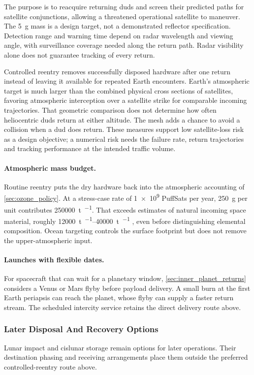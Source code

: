 \documentclass{article}
\begin{document}
The purpose is to reacquire returning duds and screen their predicted paths for satellite conjunctions, allowing a threatened operational satellite to maneuver. The \SI{5}{\gram} mass is a design target, not a demonstrated reflector specification. Detection range and warning time depend on radar wavelength and viewing angle, with surveillance coverage needed along the return path. Radar visibility alone does not guarantee tracking of every return.

Controlled reentry removes successfully disposed hardware after one return instead of leaving it available for repeated Earth encounters. Earth's atmospheric target is much larger than the combined physical cross sections of satellites, favoring atmospheric interception over a satellite strike for comparable incoming trajectories. That geometric comparison does not determine how often heliocentric duds return at either altitude. The mesh adds a chance to avoid a collision when a dud does return. These measures support low satellite-loss risk as a design objective; a numerical risk needs the failure rate, return trajectories and tracking performance at the intended traffic volume.

\paragraph{Atmospheric mass budget.}
Routine reentry puts the dry hardware back into the atmospheric accounting of \autoref{sec:ozone_policy}. At a stress-case rate of \num{1e9} PuffSats per year, \SI{250}{\gram} per unit contributes \SI{250000}{\tonne\per\year}. That exceeds estimates of natural incoming space material, roughly \SIrange{12000}{40000}{\tonne\per\year} \cite{schulz2020injection}, even before distinguishing elemental composition. Ocean targeting controls the surface footprint but does not remove the upper-atmospheric input.

\paragraph{Launches with flexible dates.}
For spacecraft that can wait for a planetary window, \autoref{sec:inner_planet_returns} considers a Venus or Mars flyby before payload delivery. A small burn at the first Earth periapsis can reach the planet, whose flyby can supply a faster return stream. The scheduled intercity service retains the direct delivery route above.

\subsubsection{Later Disposal And Recovery Options}
Lunar impact and cislunar storage remain options for later operations. Their destination phasing and receiving arrangements place them outside the preferred controlled-reentry route above.
\end{document}
